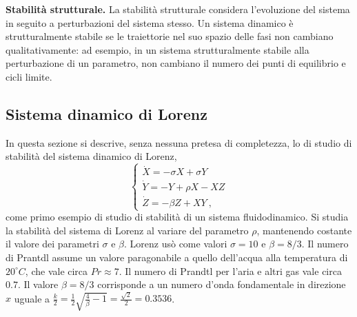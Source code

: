 \vspace{0.2cm}
\noindent
\textbf{Stabilità strutturale.}
La stabilità strutturale considera l'evoluzione del sistema in seguito a perturbazioni
 del sistema stesso. Un sistema dinamico è strutturalmente stabile se
 le traiettorie nel suo spazio delle fasi non cambiano qualitativamente: ad esempio, in un 
 sistema strutturalmente stabile alla perturbazione di un parametro,
 non cambiano il numero dei punti di equilibrio e cicli limite.

\subsection{Sistema dinamico di Lorenz}
In questa sezione si descrive, senza nessuna pretesa di completezza,
 lo di studio di stabilità del sistema dinamico di Lorenz,
\begin{equation}
    \begin{cases}
      \dot{X} = - \sigma X + \sigma Y \\
      \dot{Y} = - Y + \rho X - X Z \\
      \dot{Z} = - \beta Z + X Y \ ,
    \end{cases}
\end{equation}
 come primo esempio di studio di stabilità di un sistema fluidodinamico.
Si studia la stabilità del sistema di Lorenz al variare del parametro $\rho$,
 mantenendo costante il valore dei parametri $\sigma$ e $\beta$.
Lorenz usò come valori $\sigma = 10$ e $\beta = 8/3$.
 Il numero di Prantdl assume un valore paragonabile a quello dell'acqua alla temperatura
 di $20^\circ C$, che vale circa $Pr \approx 7$. Il numero di Prandtl per l'aria e altri gas
 vale circa $0.7$. Il valore $\beta = 8/3$ corrisponde a
 un numero d'onda fondamentale in direzione $x$ uguale a
 $\frac{k}{2} = \frac{1}{2} \sqrt{\frac{4}{\beta} - 1} = \frac{\sqrt{2}}{2} =
 0.3536$.

